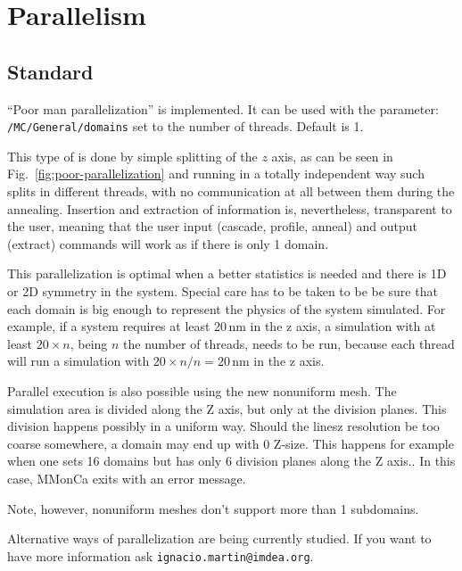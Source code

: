\section{Parallelism}

\subsection{Standard}

``Poor man parallelization'' is implemented. It can be used with the parameter: \verb+/MC/General/domains+ set to the number of threads. Default is 1.

This type of  is done by simple splitting of the $z$ axis, as can be seen in Fig.~\ref{fig:poor-parallelization} and running in a totally independent way such splits in different threads, with no communication at all between them during the annealing. Insertion and extraction of information is, nevertheless, transparent to the user, meaning that the user input (cascade, profile, anneal) and output (extract) commands will work as if there is only 1 domain.

This parallelization is optimal when a better statistics is needed and there is 1D or 2D symmetry in the system. Special care has to be taken to be be sure that each domain is big enough to represent the physics of the system simulated. For example, if a system requires at least 20\,nm in the z axis, a simulation with at least $20\times n$, being $n$ the number of threads, needs to be run, because each thread will run a simulation with $20\times n / n = 20$\,nm in the z axis.

Parallel execution is also possible using the new nonuniform mesh. The simulation area is divided along the Z axis, but only at the division planes. This division happens possibly in a uniform way. Should the linesz resolution be too coarse somewhere, a domain may end up with 0 Z-size. This happens for example when one sets 16 domains but has only 6 division planes along the Z axis.. In this case, MMonCa exits with an error message.

Note, however, nonuniform meshes don't support more than 1 subdomains.

Alternative ways of parallelization are being currently studied. If you want to have more information ask {\tt ignacio.martin@imdea.org}.

